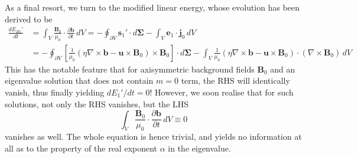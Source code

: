As a final resort, we turn to the modified linear energy, whose evolution has been derived to be
%
\[\begin{aligned}
    \frac{d E_{B1}'}{d t} &= \int_V \frac{\mathbf{B}_0}{\mu_0} \cdot \frac{\partial \mathbf{b}}{\partial t} \, dV = - \oint_{\partial V} \mathbf{s}_1' \cdot d\boldsymbol{\Sigma} - \int_V \mathbf{e}_1\cdot \mathbf{j}_0 \, dV \\
    &= - \oint_{\partial V} \left[\frac{1}{\mu_0}(\eta \nabla\times \mathbf{b} - \mathbf{u}\times \mathbf{B}_0)\times \mathbf{B}_0\right] \cdot d\boldsymbol{\Sigma} - \int_V \frac{1}{\mu_0} \left(\eta \nabla\times \mathbf{b} - \mathbf{u}\times \mathbf{B}_0\right) \cdot (\nabla\times \mathbf{B}_0)\, dV
\end{aligned}\]
%
This has the notable feature that for axisymmetric background fields $\mathbf{B}_0$ and an eigenvalue solution that does not contain $m=0$ term, the RHS will identically vanish, thus finally yielding $dE_{1}'/dt = 0$! However, we soon realise that for such solutions, not only the RHS vanishes, but the LHS
%
\[
    \int_V \frac{\mathbf{B}_0}{\mu_0} \cdot \frac{\partial \mathbf{b}}{\partial t} \, dV \equiv 0
\]
%
vanishes as well. The whole equation is hence trivial, and yields no information at all as to the property of the real exponent $\alpha$ in the eigenvalue.
